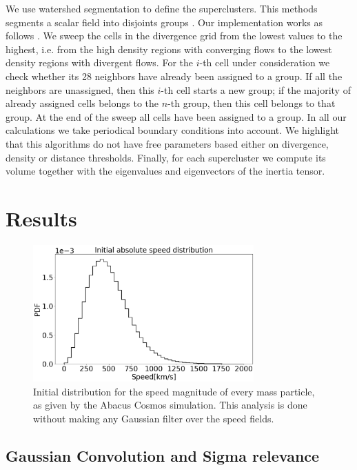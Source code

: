 \documentclass[usenatbib]{mnras}
\begin{document}
We use watershed segmentation to define the superclusters.
This methods segments a scalar field into disjoints groups \citep{BeucherWatershed1979}.
Our implementation works as follows . 
We sweep the cells in the divergence grid from the lowest values to the highest, i.e. from
the high density regions with converging flows to the lowest density regions with divergent
flows.
For the $i$-th cell under consideration we check whether its 28 neighbors have already been assigned to a group. 
If all the neighbors are unassigned, then this $i$-th cell starts a new group; if the majority of already assigned cells belongs to the $n$-th group, then this cell belongs to that group. 
At the end of the sweep all cells have been assigned to a group.
In all our calculations we take periodical boundary conditions into account. 
We highlight that this algorithms do not have free parameters based either on divergence, density or distance thresholds.
Finally, for each supercluster we compute its volume together with the eigenvalues and eigenvectors of the inertia tensor.


\section{Results}




\begin{figure}
    \centering
    \includegraphics[width=240pt]{initial_distribution.pdf}
    \caption{Initial distribution for the speed magnitude of every mass particle, as given by the Abacus Cosmos simulation. This analysis is done without making any Gaussian filter over the speed fields.}
    \label{fig:initial_distribution}
\end{figure}


\subsection{Gaussian Convolution and Sigma relevance}
\end{document}
